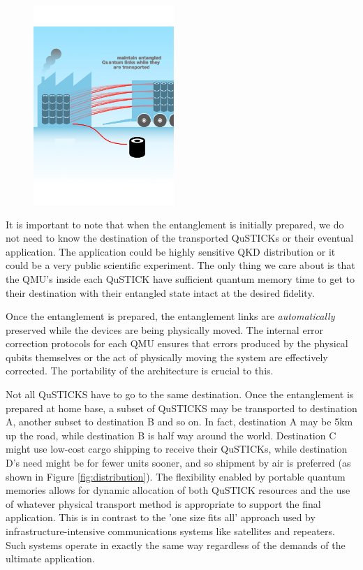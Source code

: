 \documentclass[twocolumn, aps, rmp, amsmath, amssymb, nofootinbib, superscriptaddress, longbibliography, floatfix, table-of-contents, eqsecnum]{revtex4-2}
\begin{document}
\begin{figure}[htbp!]
	\includegraphics[clip=true, width=0.475\textwidth]{qustick2}
	\caption{}
	\label{fig:loading}
\end{figure}

It is important to note that when the entanglement is initially prepared, we do not need to know the destination of the transported QuSTICKs or their eventual application. The application could be highly sensitive QKD distribution or it could be a very public scientific experiment. The only thing we care about is that the QMU's inside each QuSTICK have sufficient quantum memory time to get to their destination with their entangled state intact at the desired fidelity.

Once the entanglement is prepared, the entanglement links are \textit{automatically} preserved while the devices are being physically moved. The internal error correction protocols for each QMU ensures that errors produced by the physical qubits themselves or the act of physically moving the system are effectively corrected. The portability of the architecture is crucial to this. 

Not all QuSTICKS have to go to the same destination. Once the entanglement is prepared at home base, a subset of QuSTICKS may be transported to destination A, another subset to destination B and so on. In fact, destination A may be 5km up the road, while destination B is half way around the world. Destination C might use low-cost cargo shipping to receive their QuSTICKs, while destination D's need might be for fewer units sooner, and so shipment by air is preferred (as shown in Figure \ref{fig:distribution}). The flexibility enabled by portable quantum memories allows for dynamic allocation of both QuSTICK resources and the use of whatever physical transport method is appropriate to support the final application. This is in contrast to the 'one size fits all' approach used by infrastructure-intensive communications systems like satellites and repeaters. Such systems operate in exactly the same way regardless of the demands of the ultimate application.
\end{document}
